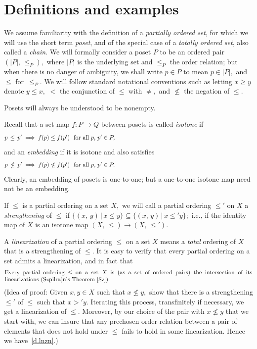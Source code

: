 \documentclass{amsart}
\numberwithin{equation}{section}
\numberwithin{theorem}{section}
\newcommand{\2}{\mathbf{2}}
\begin{document}
\section{Definitions and examples}\label{S.defs}

We assume familiarity with the definition of a
{\em partially ordered set}, for which we will use the
short term {\em poset}, and of the special case
of a {\em totally ordered set}, also called a {\em chain}.
We will formally consider a poset $P$ to be an ordered
pair $(|P|,\,\leq_P),$ where $|P|$ is the underlying set
and $\leq_P$ the order relation; but when there is no danger of
ambiguity, we shall write $p\in P$ to mean $p\in |P|,$
and $\leq$ for~$\leq_P.$
We will follow standard notational conventions such as
letting $x\geq y$ denote $y\leq x,$
$<$ the conjunction of $\leq$ with $\neq,$
and $\nleq$ the negation of $\leq.$

Posets will always be understood to be nonempty.

Recall that a set-map $f:P\to Q$ between posets is called
{\em isotone} if
%
\begin{equation}\begin{minipage}[c]{35pc}\label{d.isotone}
$p\,\leq\,p' \implies f(p)\leq f(p')$\ \ for all $p,\,p'\in P,$
\end{minipage}\end{equation}
%
and an {\em embedding} if it is isotone and also satisfies
%
\begin{equation}\begin{minipage}[c]{35pc}\label{d.embdg}
$p\,\nleq\,p' \implies f(p)\nleq f(p')$\ \ for all $p,\,p'\in P.$
\end{minipage}\end{equation}
%
Clearly, an embedding of posets is one-to-one; but a
one-to-one isotone map need not be an embedding.

If $\leq$ is a partial ordering on a set $X,$ we will call
a partial ordering $\leq'$ on $X$ a {\em strengthening} of
$\leq$ if $\{(x,\,y)\,|\,x\leq y\}\subseteq
\{(x,\,y)\,|\,x\leq' y\};$ i.e., if the identity map of
$X$ is an isotone map \mbox{$(X,\,\leq)\to (X,\,\leq').$}

A {\em linearization} of a partial ordering $\leq$ on a
set $X$ means a {\em total} ordering of $X$ that
is a strengthening of $\leq.$
It is easy to verify that every partial ordering on a
set admits a linearization, and in fact that
%
\begin{equation}\begin{minipage}[c]{35pc}\label{d.lnzn}
Every partial ordering $\leq$ on a set $X$ is (as a set of
ordered pairs) the intersection of its \mbox{linearizations}
(Szpilrajn's Theorem \cite{Sz}).
\end{minipage}\end{equation}
%
(Idea of proof:  Given $x,y\in X$ such that $x\nleq y,$ show
that there is a strengthening $\leq'$ of $\leq$ such that $x>' y.$
Iterating this process, transfinitely if necessary, we get
a linearization of $\leq.$
Moreover, by our choice of the pair with $x\nleq y$ that we start with,
we can insure that any prechosen order-relation between a pair
of elements that does not
hold under $\leq$ fails to hold in some linearization.
Hence we have~\eqref{d.lnzn}.)
\end{document}
